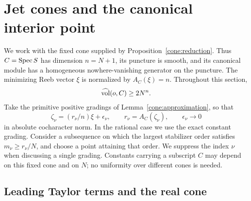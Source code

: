 \section{Jet cones and the canonical interior point}
\label{jet:section}

We work with the fixed cone supplied by
Proposition~\ref{cone:reduction}. Thus $C=\operatorname{Spec} S$ has dimension
$n=N+1$, its puncture is smooth, and its canonical module has a
homogeneous nowhere-vanishing generator on the puncture. The minimizing
Reeb vector $\xi$ is normalized by $A_C(\xi)=n$. Throughout this section,
\begin{equation}\label{jet:density-hypothesis}
 \widehat{\operatorname{vol}}(o,C)\ge 2N^n.
\end{equation}
Take the primitive positive gradings of
Lemma~\ref{cone:approximation}, so that
\[
 \zeta_\nu=(r_\nu/n)\xi+\epsilon_\nu,
 \qquad r_\nu=A_C(\zeta_\nu),\qquad \epsilon_\nu\longrightarrow0
\]
in absolute cocharacter norm. In the rational case we use the exact
constant grading. Consider a subsequence on which the largest stabilizer
order satisfies $m_\nu\ge r_\nu/N$, and choose a point attaining that
order. We suppress the index $\nu$ when discussing a single grading.
Constants carrying a subscript $C$ may depend on this fixed cone and on
$N$; no uniformity over different cones is needed.

\subsection{Leading Taylor terms and the real cone}

